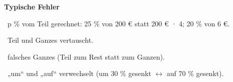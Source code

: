 \documentclass[11pt]{article}
\begin{document}
\pfheftstil
{}
{\small\noindent\textbf{Typische Fehler}\par\smallskip\noindent \textbullet\ p \% vom Teil gerechnet: 25 \% von 200 € statt 200 € · 4; 20 \% von 6 €.\par\noindent \textbullet\ Teil und Ganzes vertauscht.\par\noindent \textbullet\ falsches Ganzes (Teil zum Rest statt zum Ganzen).\par\noindent \textbullet\ „um“ und „auf“ verwechselt (um 30 \% gesenkt $\leftrightarrow$ auf 70 \% gesenkt).\par}\medskip
\begin{pfloesung}{}
\end{pfloesung}
\begin{pfloesung}{}
\end{pfloesung}
\begin{pfloesung}{}
\end{pfloesung}
\begin{pfloesung}{}
\end{pfloesung}
\begin{pfloesung}{}
\end{pfloesung}
\begin{pfloesung}{}
\end{pfloesung}
\begin{pfloesung}{}
\end{pfloesung}
\begin{pfloesung}{}
\end{pfloesung}
\begin{pfloesung}{}
\end{pfloesung}
\begin{pfloesung}{}
\end{pfloesung}
\begin{pfloesung}{}
\end{pfloesung}
\begin{pfloesung}{}
\end{pfloesung}
\begin{pfloesung}{}
\end{pfloesung}
\begin{pfloesung}{}
\end{pfloesung}
\end{document}
